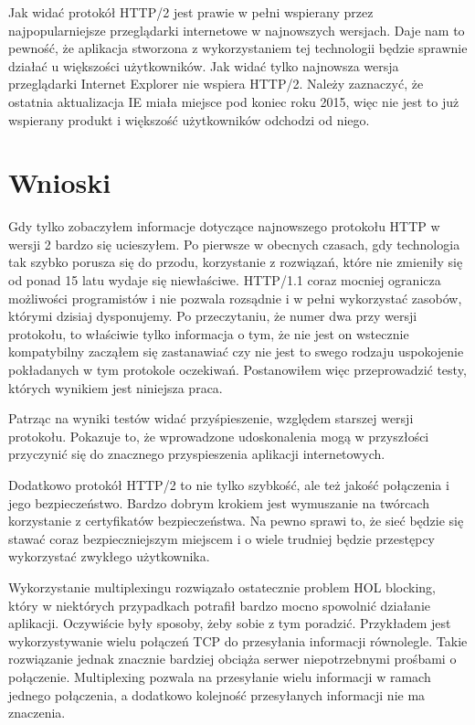 \documentclass[a4paper,12pt,twoside,openany]{report}
\begin{document}
Jak widać protokół HTTP/2 jest prawie w pełni wspierany przez najpopularniejsze przeglądarki internetowe w najnowszych wersjach.
Daje nam to pewność, że aplikacja stworzona z wykorzystaniem tej technologii będzie sprawnie działać u większości użytkowników.
Jak widać tylko najnowsza wersja przeglądarki Internet Explorer nie wspiera HTTP/2.
Należy zaznaczyć, że ostatnia aktualizacja IE miała miejsce pod koniec roku 2015, więc nie jest to już wspierany produkt i większość użytkowników odchodzi od niego.

\chapter{Wnioski}


Gdy tylko zobaczyłem informacje dotyczące najnowszego protokołu HTTP w wersji 2 bardzo się ucieszyłem.
Po pierwsze w obecnych czasach, gdy technologia tak szybko porusza się do przodu, korzystanie z rozwiązań, które nie zmieniły się od ponad 15 latu wydaje się niewłaściwe.
HTTP/1.1 coraz mocniej ogranicza możliwości programistów i nie pozwala rozsądnie i w pełni wykorzystać zasobów, którymi dzisiaj dysponujemy.
Po przeczytaniu, że numer dwa przy wersji protokołu, to właściwie tylko informacja o tym, że nie jest on wstecznie kompatybilny zacząłem się zastanawiać czy nie jest to swego rodzaju uspokojenie pokładanych w tym protokole oczekiwań.
Postanowiłem więc przeprowadzić testy, których wynikiem jest niniejsza praca.

Patrząc na wyniki testów widać przyśpieszenie, względem starszej wersji protokołu.
Pokazuje to, że wprowadzone udoskonalenia mogą w przyszłości przyczynić się do znacznego przyspieszenia aplikacji internetowych.

Dodatkowo protokół HTTP/2 to nie tylko szybkość, ale też jakość połączenia i jego bezpieczeństwo.
Bardzo dobrym krokiem jest wymuszanie na twórcach korzystanie z certyfikatów bezpieczeństwa.
Na pewno sprawi to, że sieć będzie się stawać coraz bezpieczniejszym miejscem i o wiele trudniej będzie przestępcy wykorzystać zwykłego użytkownika.

Wykorzystanie multiplexingu rozwiązało ostatecznie problem HOL blocking, który w niektórych przypadkach potrafił bardzo mocno spowolnić działanie aplikacji. 
Oczywiście były sposoby, żeby sobie z tym poradzić.
Przykładem jest wykorzystywanie wielu połączeń TCP do przesyłania informacji równolegle.
Takie rozwiązanie jednak znacznie bardziej obciąża serwer niepotrzebnymi prośbami o połączenie.
Multiplexing pozwala na przesyłanie wielu informacji w ramach jednego połączenia, a dodatkowo kolejność przesyłanych informacji nie ma znaczenia.
\end{document}
